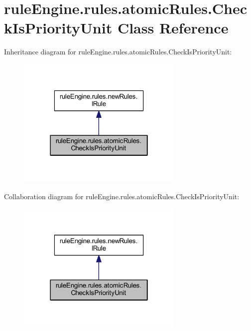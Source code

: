 \hypertarget{classrule_engine_1_1rules_1_1atomic_rules_1_1_check_is_priority_unit}{}\section{rule\+Engine.\+rules.\+atomic\+Rules.\+Check\+Is\+Priority\+Unit Class Reference}
\label{classrule_engine_1_1rules_1_1atomic_rules_1_1_check_is_priority_unit}


Inheritance diagram for rule\+Engine.\+rules.\+atomic\+Rules.\+Check\+Is\+Priority\+Unit\+:
\nopagebreak
\begin{figure}[H]
\begin{center}
\leavevmode
\includegraphics[width=226pt]{classrule_engine_1_1rules_1_1atomic_rules_1_1_check_is_priority_unit__inherit__graph}
\end{center}
\end{figure}


Collaboration diagram for rule\+Engine.\+rules.\+atomic\+Rules.\+Check\+Is\+Priority\+Unit\+:
\nopagebreak
\begin{figure}[H]
\begin{center}
\leavevmode
\includegraphics[width=226pt]{classrule_engine_1_1rules_1_1atomic_rules_1_1_check_is_priority_unit__coll__graph}
\end{center}
\end{figure}
